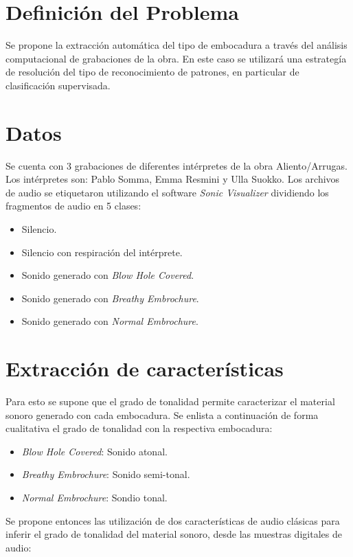 \documentclass{article}
\begin{document}
\section*{Definición del Problema}
Se propone la extracción automática del tipo de embocadura a través del análisis computacional de grabaciones de la obra. En este caso se utilizará una estrategía de resolución del tipo de reconocimiento de patrones, en particular de clasificación supervisada. 

\section*{Datos}
Se cuenta con 3 grabaciones de diferentes intérpretes de la obra Aliento/Arrugas. Los intérpretes son: Pablo Somma, Emma Resmini y Ulla Suokko. Los archivos de audio se etiquetaron utilizando el software \textit{Sonic Visualizer} dividiendo los fragmentos de audio en 5 clases:

\begin{itemize} 
  \item Silencio.
  \item Silencio con respiración del intérprete. 
  \item Sonido generado con \textit{Blow Hole Covered}.
  \item Sonido generado con \textit{Breathy Embrochure}.
  \item Sonido generado con \textit{Normal Embrochure}.
\end{itemize}


 

\section*{Extracción de características}

Para esto se supone que el grado de tonalidad permite caracterizar el material sonoro generado con cada embocadura. Se enlista a continuación de forma cualitativa el grado de tonalidad con la respectiva embocadura:

\begin{itemize} 
  \item \textit{Blow Hole Covered}: Sonido atonal.
  \item \textit{Breathy Embrochure}: Sonido semi-tonal. 
  \item \textit{Normal Embrochure}: Sondio tonal.
\end{itemize}

Se propone entonces las utilización de dos características de audio clásicas para inferir el grado de tonalidad del material sonoro, desde las muestras digitales de audio: 
\end{document}
